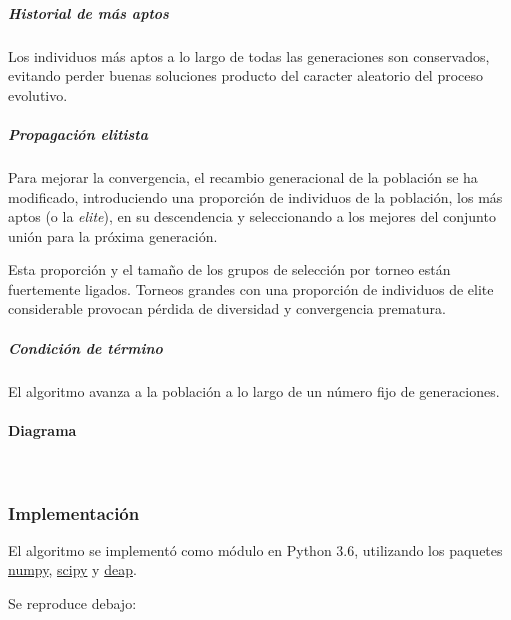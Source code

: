 \documentclass[11pt]{article}
\begin{document}
\subparagraph{Historial de más aptos}\label{historial-de-muxe1s-aptos}

Los individuos más aptos a lo largo de todas las generaciones son
conservados, evitando perder buenas soluciones producto del caracter
aleatorio del proceso evolutivo.

\subparagraph{Propagación elitista}\label{propagaciuxf3n-elitista}

Para mejorar la convergencia, el recambio generacional de la población
se ha modificado, introduciendo una proporción de individuos de la
población, los más aptos (o la \emph{elite}), en su descendencia y
seleccionando a los mejores del conjunto unión para la próxima
generación.

Esta proporción y el tamaño de los grupos de selección por torneo están
fuertemente ligados. Torneos grandes con una proporción de individuos de
elite considerable provocan pérdida de diversidad y convergencia
prematura.

\subparagraph{Condición de término}\label{condiciuxf3n-de-tuxe9rmino}

El algoritmo avanza a la población a lo largo de un número fijo de
generaciones.

\pagebreak

\paragraph{Diagrama}\label{diagrama}

    
    \begin{center}
    \end{center}
    { \hspace*{\fill} \\}
    

    \subsubsection{Implementación}\label{implementaciuxf3n}

El algoritmo se implementó como módulo en Python 3.6, utilizando los
paquetes \href{https://www.numpy.org/}{numpy},
\href{https://scipy.org/}{scipy} y
\href{https://deap.readthedocs.io/en/master/}{deap}.

Se reproduce debajo:

\hrulefill
\end{document}
